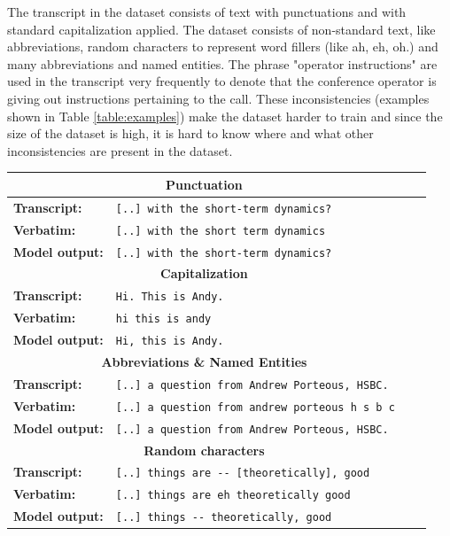 The transcript in the dataset consists of text with punctuations and with standard capitalization applied. The dataset consists of non-standard text, like abbreviations, random characters to represent word fillers (like ah, eh, oh.) and many abbreviations and named entities. The phrase "operator instructions" are used in the transcript very frequently to denote that the conference operator is giving out instructions pertaining to the call. These inconsistencies (examples shown in Table \ref{table:examples}) make the dataset harder to train and since the size of the dataset is high, it is hard to know where and what other inconsistencies are present in the dataset. 

\begin{table}[ht]
\begin{tabular}{ l p{9.6cm} c c }

 \hline
 \multicolumn{2}{c}{\textbf{Punctuation}} \\
 \hline
 \textbf{Transcript:} & \verb|[..] with the short-term dynamics?| \\ 
 \textbf{Verbatim:} & \verb|[..] with the short term dynamics| \\
 \textbf{Model output:} & \verb|[..] with the short-term dynamics?| \\
 \hline\hline

 \multicolumn{2}{c}{\textbf{Capitalization}} \\
 \hline
 \textbf{Transcript:} & \verb|Hi. This is Andy.| \\ 
 \textbf{Verbatim:} & \verb|hi this is andy| \\
 \textbf{Model output:} & \verb|Hi, this is Andy.| \\
 \hline\hline
 
 \multicolumn{2}{c}{\textbf{Abbreviations \& Named Entities}} \\
 \hline
 \textbf{Transcript:} & \verb|[..] a question from Andrew Porteous, HSBC.| \\ 
 \textbf{Verbatim:} & \verb|[..] a question from andrew porteous h s b c| \\
 \textbf{Model output:} & \verb|[..] a question from Andrew Porteous, HSBC.| \\
 \hline\hline
 
 \multicolumn{2}{c}{\textbf{Random characters}} \\
 \hline
 \textbf{Transcript:} & \verb|[..] things are -- [theoretically], good| \\ 
 \textbf{Verbatim:} & \verb|[..] things are eh theoretically good| \\
 \textbf{Model output:} & \verb|[..] things -- theoretically, good| \\
 \hline\hline
 

\end{tabular}
\end{table}
